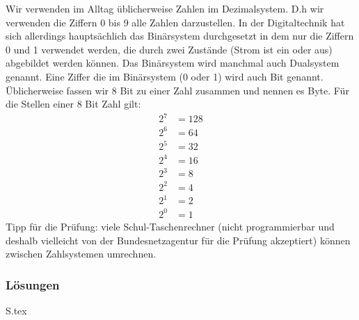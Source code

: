 \documentclass[10pt,a4paper,ngerman]{article}
\theoremstyle{definition}
\theoremstyle{plain}
\theoremstyle{mytheorem}
\theoremstyle{definition}
\newenvironment{ohmchapter}{}
{
  \subsubsection*{Lösungen}
  S\arabic{subsection}.tex}
}
\begin{document}
\begin{ohmchapter}
  Wir verwenden im Alltag üblicherweise Zahlen im Dezimalsystem. D.h wir verwenden die Ziffern 0 bis 9 alle Zahlen darzustellen. 
  In der Digitaltechnik hat sich allerdings hauptsächlich das Binärsystem durchgesetzt in dem nur die Ziffern 0 und 1 verwendet werden, die durch zwei Zustände (Strom ist ein oder aus) abgebildet werden können.  Das Binärsystem wird manchmal auch Dualsystem genannt.
   Eine Ziffer die im Binärsystem (0 oder 1) wird auch Bit genannt.
  Üblicherweise fassen wir 8 Bit zu einer Zahl zusammen und nennen es Byte.
  Für die Stellen einer 8 Bit Zahl gilt: 
  \begin{align*}
    2^7 &= 128 \\         
    2^6 &= 64 \\
    2^5 &= 32 \\  
    2^4 &= 16 \\         
    2^3 &= 8  \\
    2^2 &= 4 \\         
    2^1 &= 2  \\   
    2^0 &= 1  
  \end{align*}  
Tipp für die Prüfung: viele Schul-Taschenrechner (nicht programmierbar und deshalb vielleicht von der Bundesnetzagentur für die Prüfung akzeptiert) können zwischen Zahlsystemen umrechnen.
\end{ohmchapter}
\end{document}
